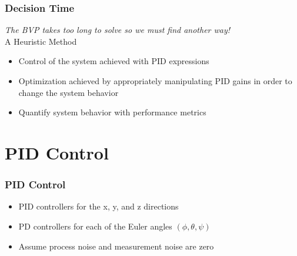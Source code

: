 \documentclass{beamer}
\begin{document}

\begin{frame}
\frametitle{Decision Time}

\textit{The BVP takes too long to solve so we must find another way!}\\

A Heuristic Method

\begin{itemize}
\item Control of the system achieved with PID expressions
\item Optimization achieved by appropriately manipulating PID gains in order to change the system behavior
\item Quantify system behavior with performance metrics
\end{itemize}

\end{frame}



\section{PID Control}


\begin{frame}
\frametitle{PID Control}


\begin{itemize}
\item PID controllers for the x, y, and z directions

\item PD controllers for each of the Euler angles $(\phi,\theta,\psi)$

\item Assume process noise and measurement noise are zero
\end{itemize}

\end{frame}




\end{document}
